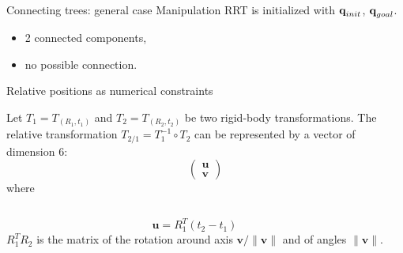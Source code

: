 %
%

\begin {frame} {Connecting trees: general case}
Manipulation RRT is initialized with $\textbf{q}_{init}$, $\textbf{q}_{goal}$.
\begin {itemize}
\item 2 connected components,
\item no possible connection.
\end {itemize}
\end{frame}

%
%

\begin {frame} {Relative positions as numerical constraints}

Let $T_1 = T_{(R_1,t_1)}$ and $T_2 = T_{(R_2,t_2)}$ be two rigid-body transformations. The relative transformation $T_{2/1} = T_1^{-1}\circ T_2$ can be represented by a vector of dimension 6:
$$
\left(\begin{array}{c} \mathbf{u} \\ \mathbf {v}\end{array}\right)
$$
where
\begin {columns}
$$
\mathbf{u} = R_1^T (t_2-t_1)
$$
$R_1^T R_2$ is the matrix of the rotation around axis $\mathbf{v}/\|\mathbf {v}\|$ and of angles $\|\mathbf {v}\|$.
\end {columns}
\end {frame}
